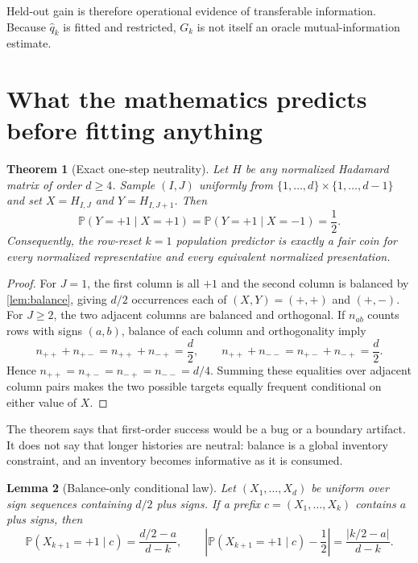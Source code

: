 \documentclass[10pt,twoside]{article}
\theoremstyle{noteplain}
\newtheorem{theorem}{Theorem}
\newtheorem{lemma}[theorem]{Lemma}
\theoremstyle{definition}
\newcommand{\Prb}{\mathbb{P}}
\begin{document}
Held-out gain is therefore operational evidence of transferable information.  Because $\widehat q_k$ is fitted and restricted, $G_k$ is not itself an oracle mutual-information estimate.

\section{What the mathematics predicts before fitting anything}

\begin{theorem}[Exact one-step neutrality]\label{thm:onestep}
Let $H$ be any normalized Hadamard matrix of order $d\ge4$.  Sample $(I,J)$ uniformly from $\{1,\ldots,d\}\times\{1,\ldots,d-1\}$ and set $X=H_{I,J}$ and $Y=H_{I,J+1}$.  Then
\begin{equation}
\Prb(Y=+1\mid X=+1)=\Prb(Y=+1\mid X=-1)=\frac12.
\end{equation}
Consequently, the row-reset $k=1$ population predictor is exactly a fair coin for every normalized representative and every equivalent normalized presentation.
\end{theorem}

\begin{proof}
For $J=1$, the first column is all $+1$ and the second column is balanced by \cref{lem:balance}, giving $d/2$ occurrences each of $(X,Y)=(+,+)$ and $(+,-)$.  For $J\ge2$, the two adjacent columns are balanced and orthogonal.  If $n_{ab}$ counts rows with signs $(a,b)$, balance of each column and orthogonality imply
\[
n_{++}+n_{+-}=n_{++}+n_{-+}=\frac d2,
\qquad
n_{++}+n_{--}=n_{+-}+n_{-+}=\frac d2.
\]
Hence $n_{++}=n_{+-}=n_{-+}=n_{--}=d/4$.  Summing these equalities over adjacent column pairs makes the two possible targets equally frequent conditional on either value of $X$.
\end{proof}

The theorem says that first-order success would be a bug or a boundary artifact.  It does not say that longer histories are neutral: balance is a global inventory constraint, and an inventory becomes informative as it is consumed.

\begin{lemma}[Balance-only conditional law]\label{lem:urn}
Let $(X_1,\ldots,X_d)$ be uniform over sign sequences containing $d/2$ plus signs.  If a prefix $c=(X_1,\ldots,X_k)$ contains $a$ plus signs, then
\begin{equation}\label{eq:balance-law}
\Prb(X_{k+1}=+1\mid c)=\frac{d/2-a}{d-k},
\qquad
\left|\Prb(X_{k+1}=+1\mid c)-\frac12\right|
=\frac{|k/2-a|}{d-k}.
\end{equation}
\end{lemma}
\end{document}
